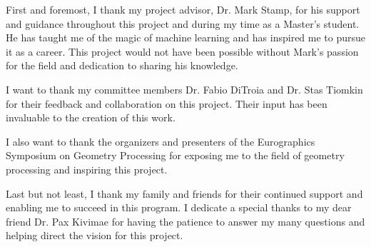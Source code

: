 First and foremost, I thank my project advisor, Dr. Mark Stamp, for his support and guidance throughout this project and during my time as a Master's student. He has taught me of the magic of machine learning and has inspired me to pursue it as a career. This project would not have been possible without Mark's passion for the field and dedication to sharing his knowledge.

I want to thank my committee members Dr. Fabio DiTroia and Dr. Stas Tiomkin for their feedback and collaboration on this project. Their input has been invaluable to the creation of this work.

I also want to thank the organizers and presenters of the Eurographics Symposium on Geometry Processing for exposing me to the field of geometry processing and inspiring this project.

Last but not least, I thank my family and friends for their continued support and enabling me to succeed in this program. I dedicate a special thanks to my dear friend Dr. Pax Kivimae for having the patience to answer my many questions and helping direct the vision for this project.
